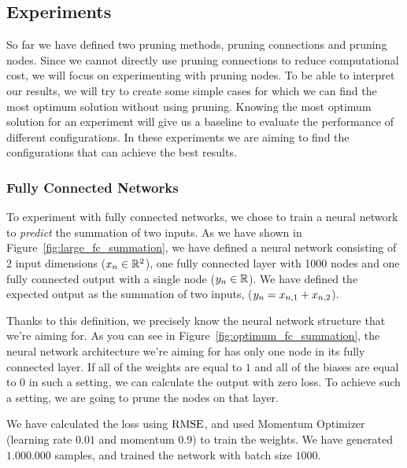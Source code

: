 \subsection{Experiments}
So far we have defined two pruning methods, pruning connections and pruning nodes. Since we cannot directly use pruning connections to reduce computational cost, we will focus on experimenting with pruning nodes. To be able to interpret our results, we will try to create some simple cases for which we can find the most optimum solution without using pruning. Knowing the most optimum solution for an experiment will give us a baseline to evaluate the performance of different configurations. In these experiments we are aiming to find the configurations that can achieve the best results.

\subsubsection{Fully Connected Networks}
To experiment with fully connected networks, we chose to train a neural network to \textit{predict} the summation of two inputs. As we have shown in Figure~\ref{fig:large_fc_summation}, we have defined a neural network consisting of 2 input dimensions ($x_{n} \in \mathbb{R}^{2}$), one fully connected layer with 1000 nodes and one fully connected output with a single node ($y_{n} \in \mathbb{R}$). We have defined the expected output as the summation of two inputs, ($y_{n} = x_{n,1} + x_{n,2}$). 

Thanks to this definition, we precisely know the neural network structure that we're aiming for. As you can see in Figure~\ref{fig:optimum_fc_summation}, the neural network architecture we're aiming for has only one node in its fully connected layer. If all of the weights are equal to $1$ and all of the biases are equal to $0$ in such a setting, we can calculate the output with zero loss. To achieve such a setting, we are going to prune the nodes on that layer.

We have calculated the loss using $\textrm{RMSE}$, and used Momentum Optimizer (learning rate $0.01$ and momentum $0.9$) to train the weights. We have generated $1.000.000$ samples, and trained the network with batch size $1000$.

